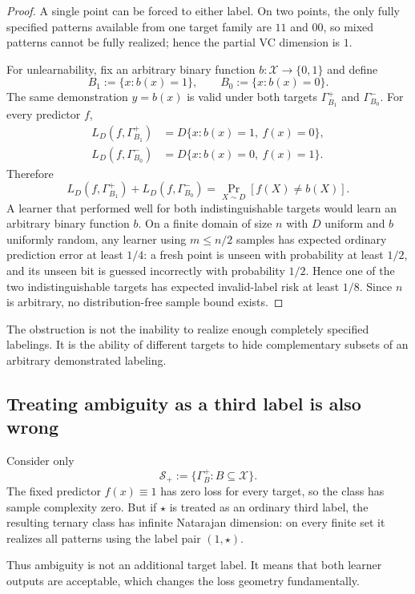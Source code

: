 \documentclass[11pt]{article}
\theoremstyle{definition}
\theoremstyle{remark}
\newcommand{\X}{\mathcal X}
\newcommand{\Y}{\{0,1\}}
\newcommand{\SV}{\mathcal S}
\newcommand{\1}{\mathbf 1}
\begin{document}
\begin{proof}
A single point can be forced to either label. On two points, the only fully specified patterns available from one target family are $11$ and $00$, so mixed patterns cannot be fully realized; hence the partial VC dimension is $1$.

For unlearnability, fix an arbitrary binary function $b:\X\to\Y$ and define
\[
    B_1:=\{x:b(x)=1\},
    \qquad
    B_0:=\{x:b(x)=0\}.
\]
The same demonstration $y=b(x)$ is valid under both targets $\Gamma_{B_1}^+$ and $\Gamma_{B_0}^-$. For every predictor $f$,
\begin{align*}
    L_D(f,\Gamma_{B_1}^+)
    &=D\{x:b(x)=1,\ f(x)=0\},\\
    L_D(f,\Gamma_{B_0}^-)
    &=D\{x:b(x)=0,\ f(x)=1\}.
\end{align*}
Therefore
\[
    L_D(f,\Gamma_{B_1}^+)
    +
    L_D(f,\Gamma_{B_0}^-)
    =
    \Pr_{X\sim D}[f(X)\neq b(X)].
\]
A learner that performed well for both indistinguishable targets would learn an arbitrary binary function $b$. On a finite domain of size $n$ with $D$ uniform and $b$ uniformly random, any learner using $m\leq n/2$ samples has expected ordinary prediction error at least $1/4$: a fresh point is unseen with probability at least $1/2$, and its unseen bit is guessed incorrectly with probability $1/2$. Hence one of the two indistinguishable targets has expected invalid-label risk at least $1/8$. Since $n$ is arbitrary, no distribution-free sample bound exists.
\end{proof}

The obstruction is not the inability to realize enough completely specified labelings. It is the ability of different targets to hide complementary subsets of an arbitrary demonstrated labeling.

\subsection{Treating ambiguity as a third label is also wrong}

Consider only
\[
    \SV_+:=\{\Gamma_B^+:B\subseteq\X\}.
\]
The fixed predictor $f(x)\equiv1$ has zero loss for every target, so the class has sample complexity zero. But if $\star$ is treated as an ordinary third label, the resulting ternary class has infinite Natarajan dimension: on every finite set it realizes all patterns using the label pair $(1,\star)$.

Thus ambiguity is not an additional target label. It means that both learner outputs are acceptable, which changes the loss geometry fundamentally.
\end{document}
